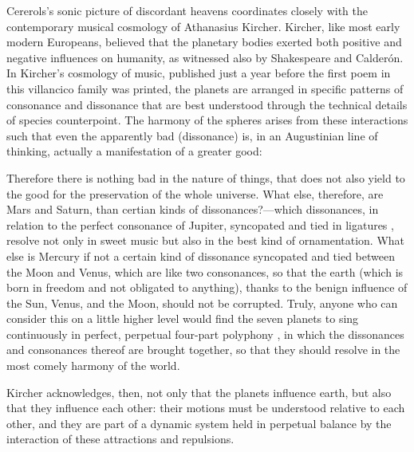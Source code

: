 Cererols's sonic picture of discordant heavens coordinates closely with the
contemporary musical cosmology of Athanasius Kircher.
Kircher, like most early modern Europeans, believed that the planetary bodies
exerted both positive and negative influences on humanity, as witnessed also by
Shakespeare and Calderón.
In Kircher's cosmology of music, published just a year before the first poem in
this villancico family was printed, the planets are arranged in specific
patterns of consonance and dissonance that are best understood through the
technical details of species counterpoint.%
The harmony of the spheres arises from these interactions such that even the
apparently bad (dissonance) is, in an Augustinian line of thinking, actually a
manifestation of a greater good:
\begin{quoting}
	Therefore there is nothing bad in the nature of things, that does not
	also yield to the good for the preservation of the whole universe.
	What else, therefore, are Mars and Saturn, than certian kinds of
        dissonances?---which dissonances, in relation to the perfect consonance
        of Jupiter, syncopated and tied in ligatures , resolve
        not only in sweet music but also in the best kind of ornamentation.
	What else is Mercury if not a certain kind of dissonance syncopated and
	tied between the Moon and Venus, which are like two consonances, so that
	the earth (which is born in freedom and not obligated to anything),
	thanks to the benign influence of the Sun, Venus, and the Moon, should
	not be corrupted.
	Truly, anyone who can consider this on a little higher level would find
	the seven planets to sing continuously in perfect, perpetual four-part
	polyphony , in which the dissonances and
	consonances thereof are brought together, so that they should resolve in
	the most comely harmony of the world.%
        \Autocite[, 383--384]{Kircher:Musurgia}
\end{quoting}
Kircher acknowledges, then, not only that the planets influence earth, but also
that they influence each other: their motions must be understood relative to
each other, and they are part of a dynamic system held in perpetual balance by
the interaction of these attractions and repulsions.

